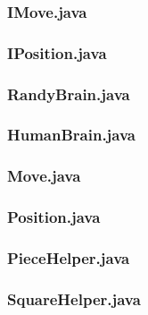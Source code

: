 \documentclass [12pt ,a4paper, naustrian]{scrartcl}
\theoremstyle{plain}
\theoremstyle{definition}
\theoremstyle{remark}
\begin{document}
\subsubsection*{IMove.java}


\subsubsection*{IPosition.java}


\subsubsection*{RandyBrain.java}


\subsubsection*{HumanBrain.java}


\subsubsection*{Move.java}


\subsubsection*{Position.java}


\subsubsection*{PieceHelper.java}


\subsubsection*{SquareHelper.java}

\end{document}
